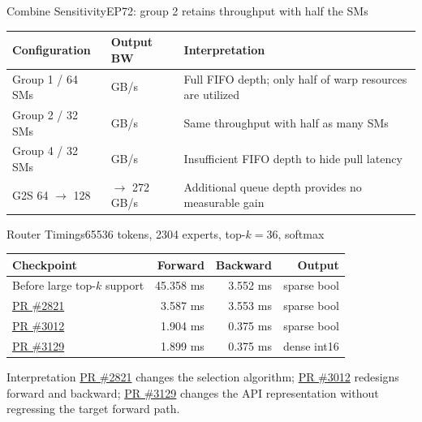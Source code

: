 \documentclass[aspectratio=169,10pt]{beamer}
\renewcommand{\NvidiaSource}[1]{}
\newcommand{\LocalSource}[1]{\NvidiaSource{\texttt{#1}}}
\begin{document}
\begin{frame}{Combine Sensitivity}{EP72: group 2 retains throughput with half the SMs}
  \LocalSource{notes/hybrid-ep-sparse-opt-new.md}
  \renewcommand{\arraystretch}{1.16}
  \begin{tabularx}{\textwidth}{@{}>{\NvidiaSansMedium}p{} >{\raggedleft\arraybackslash}p{} >{\raggedright\arraybackslash}X@{}}
    \toprule
    Configuration & Output BW & Interpretation \\
    \midrule
    Group 1 / 64 SMs & 265 GB/s & Full FIFO depth; only half of warp resources are utilized \\
    Group 2 / 32 SMs & 263 GB/s & Same throughput with half as many SMs \\
    Group 4 / 32 SMs & 133 GB/s & Insufficient FIFO depth to hide pull latency \\
    G2S 64 $\rightarrow$ 128 & 271 $\rightarrow$ 272 GB/s & Additional queue depth provides no measurable gain \\
    \bottomrule
  \end{tabularx}
\end{frame}

\begin{frame}{Router Timings}{65536 tokens, 2304 experts, top-$k=36$, softmax}
  \NvidiaSource{\texttt{data/trace-back-comparisons/router\_benchmark\_combined.csv}}
  \renewcommand{\arraystretch}{1.23}
  \begin{tabularx}{\textwidth}{@{}>{\NvidiaSansMedium}X r r r@{}}
    \toprule
    Checkpoint & Forward & Backward & Output \\
    \midrule
    Before large top-$k$ support & 45.358 ms & 3.552 ms & sparse bool \\
    \href{https://github.com/NVIDIA/TransformerEngine/pull/2821}{PR \#2821} & 3.587 ms & 3.553 ms & sparse bool \\
    \href{https://github.com/NVIDIA/TransformerEngine/pull/3012}{PR \#3012} & 1.904 ms & 0.375 ms & sparse bool \\
    \href{https://github.com/NVIDIA/TransformerEngine/pull/3129}{PR \#3129} & 1.899 ms & 0.375 ms & dense int16 \\
    \bottomrule
  \end{tabularx}
  \vspace{.13in}
  \begin{NvidiaEvidence}{Interpretation}
    \href{https://github.com/NVIDIA/TransformerEngine/pull/2821}{PR \#2821} changes the selection algorithm;
    \href{https://github.com/NVIDIA/TransformerEngine/pull/3012}{PR \#3012} redesigns forward and backward;
    \href{https://github.com/NVIDIA/TransformerEngine/pull/3129}{PR \#3129} changes the API representation without regressing the target forward path.
  \end{NvidiaEvidence}
\end{frame}
\end{document}
